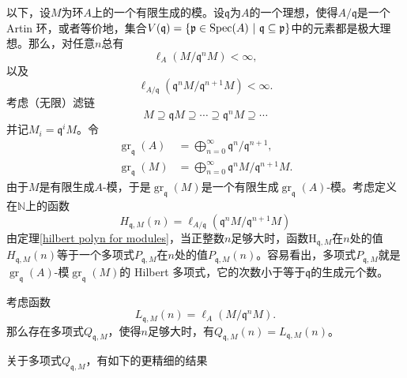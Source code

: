 以下，设$M$为环$A$上的一个有限生成的模。设$\mathfrak{q}$为$A$的一个理想，使得$A/\mathfrak{q}$是一个 Artin 环，或者等价地，集合$V(\mathfrak{q}) = \{\mathfrak{p} \in \operatorname{Spec}(A) \ |\ \mathfrak{q} \subseteq \mathfrak{p} \}$中的元素都是极大理想。那么，对任意$n$总有
\begin{equation}
\ell_A(M / \mathfrak{q}^n M) < \infty,
\end{equation}
以及
\begin{equation}
\ell_{A/\mathfrak{q}}(\mathfrak{q}^n M / \mathfrak{q}^{n+1} M) < \infty.
\end{equation}
考虑（无限）滤链
\begin{equation}
M \supseteq \mathfrak{q} M \supseteq \cdots \supseteq \mathfrak{q}^n M \supseteq \cdots
\end{equation}
并记$M_i = \mathfrak{q}^i M$。令
\begin{align}
\operatorname{gr}_{\mathfrak{q}}(A) & = \bigoplus\limits_{n=0}^{\infty} \mathfrak{q}^n / \mathfrak{q}^{n+1}, \\
\operatorname{gr}_{\mathfrak{q}}(M) & = \bigoplus\limits_{n=0}^{\infty} \mathfrak{q}^n M / \mathfrak{q}^{n+1} M.
\end{align}
由于$M$是有限生成$A$-模，于是$\operatorname{gr}_{\mathfrak{q}}(M)$是一个有限生成$\operatorname{gr}_{\mathfrak{q}}(A)$-模。考虑定义在$\mathbb{N}$上的函数
\begin{equation}
H_{\mathfrak{q},M}(n) = \ell_{A/\mathfrak{q}}(\mathfrak{q}^n M / \mathfrak{q}^{n+1} M)
\end{equation}
由定理\ref{hilbert polyn for modules}，当正整数$n$足够大时，函数H$_{\mathfrak{q},M}$在$n$处的值$H_{\mathfrak{q},M}(n)$等于一个多项式$P_{\mathfrak{q},M}$在$n$处的值$P_{\mathfrak{q},M}(n)$。容易看出，多项式$P_{\mathfrak{q},M}$就是$\operatorname{gr}_{\mathfrak{q}}(A)$-模$\operatorname{gr}_{\mathfrak{q}}(M)$的 Hilbert 多项式，它的次数小于等于$\mathfrak{q}$的生成元个数。

\begin{theorem}
考虑函数
\begin{equation}
L_{\mathfrak{q},M}(n) = \ell_{A}(M / \mathfrak{q}^n M).
\end{equation}
那么存在多项式$Q_{\mathfrak{q},M}$，使得$n$足够大时，有$Q_{\mathfrak{q},M}(n) = L_{\mathfrak{q},M}(n)$。
\end{theorem}

关于多项式$Q_{\mathfrak{q},M}$，有如下的更精细的结果

